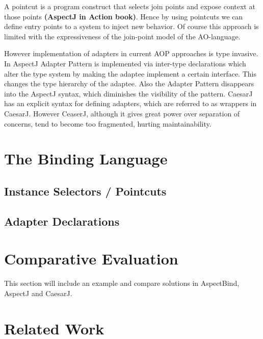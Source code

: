 \documentclass{llncs}
\begin{document}
\textcolor[rgb]{0.50,0.50,0.50}{A pointcut is a program construct that selects join points and expose context at
those points \textbf{(AspectJ in Action book)}. Hence by using pointcuts we can
define entry points to a system to inject new behavior. Of course this approach
is limited with the expressiveness of the join-point model of the AO-language. }

However implementation of adapters in current AOP approaches is type invasive. In AspectJ Adapter Pattern is implemented via inter-type declarations which alter the type system by making the adaptee implement a certain interface. This changes the type hierarchy of the adaptee. Also the Adapter Pattern disappears into the AspectJ syntax, which diminishes the visibility of the pattern. CaesarJ has an explicit syntax for defining adapters, which are referred to as wrappers in CaesarJ. However CeaserJ, although it gives great power over separation of concerns, tend to become too fragmented, hurting maintainability. 


\section{The Binding Language}
\subsection{Instance Selectors / Pointcuts}
\subsection{Adapter Declarations}


\section{Comparative Evaluation}
This section will include an example and compare solutions in AspectBind, AspectJ and CaesarJ.



\section{Related Work}
\end{document}
